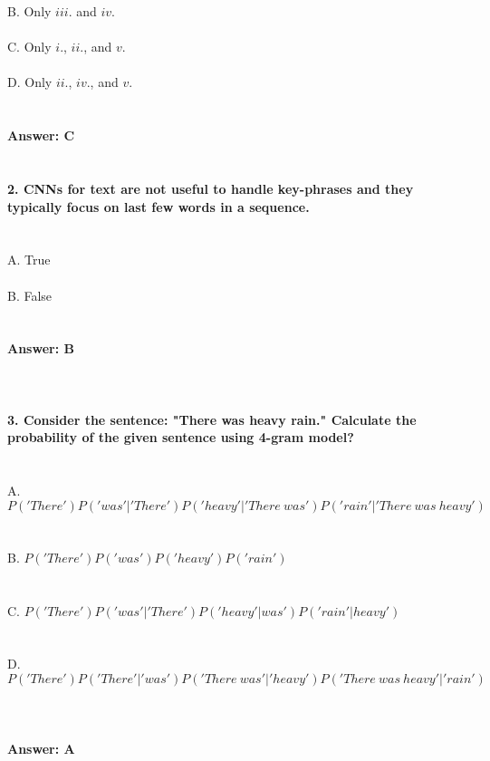 \documentclass[prl,twocolumn,showpacs,preprintnumbers,superscriptaddress]{revtex4}
\theoremstyle{plain}
\theoremstyle{definition}
\begin{document}
\begin{widetext}
B. Only $iii.$ and $iv.$
\\
\\
C. Only $i.$, $ii.$, and $v$. 
\\
\\
D. Only $ii.$, $iv.$, and $v$.
\\
\\
\\
\textbf{Answer: C}
\\
\\
\\
\textbf{2. CNNs for text are not useful to handle key-phrases and they typically focus on last few words in a sequence.}
\\
\\
\\
A. True
\\
\\
B. False
\\
\\
\\
\textbf{Answer: B}
\\
\\
\\
\\
\noindent\textbf{3. Consider the sentence: "There was heavy rain." Calculate the probability of the given sentence using 4-gram model?}
\\
\\
\\
A. $P('There')P('was'|'There')P('heavy'|'There\  was')P('rain'|'There\  was\  heavy')$
\\
\\
\\
B. $P('There')P('was')P('heavy')P('rain')$
\\
\\
\\
C. $P('There')P('was'|'There')P('heavy'|was')P('rain'|heavy')$
\\
\\
\\
D. $P('There')P('There'|'was')P('There\  was'|'heavy')P('There\  was\  heavy'|'rain')$  
\\
\\
\\
\\\textbf{Answer: A}
\\

\end{widetext}
\end{document}
